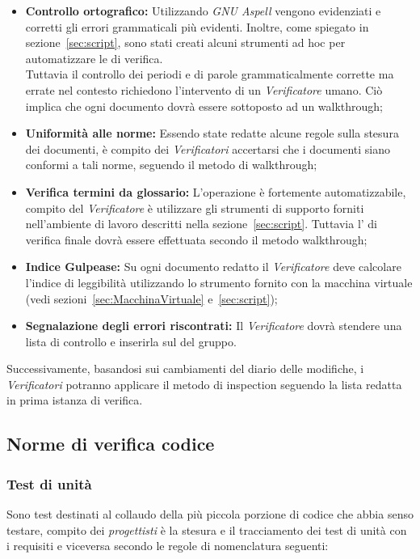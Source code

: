 \documentclass{scalatekids-article}
\begin{document}
\begin{itemize}
\item\textbf{Controllo ortografico:} Utilizzando \textit{GNU Aspell} vengono evidenziati e corretti
  gli errori grammaticali più evidenti. Inoltre, come spiegato in sezione~\ref{sec:script}, sono stati
  creati alcuni strumenti ad hoc per automatizzare le  di verifica.\\
  Tuttavia il controllo dei periodi e di parole grammaticalmente corrette ma errate nel contesto richiedono
  l'intervento di un \textit{Verificatore} umano. Ciò implica che ogni documento dovrà essere sottoposto ad un walkthrough;
\item\textbf{Uniformità alle norme:} Essendo state redatte alcune regole sulla stesura dei documenti, è compito dei \textit{Verificatori}
  accertarsi che i documenti siano conformi a tali norme, seguendo il metodo di walkthrough;
\item\textbf{Verifica termini da glossario:} L'operazione è fortemente automatizzabile, compito del \textit{Verificatore} è utilizzare gli strumenti di supporto
  forniti nell'ambiente di lavoro descritti nella sezione~\ref{sec:script}. Tuttavia l' di verifica finale dovrà essere effettuata secondo il metodo
  walkthrough;
\item\textbf{Indice Gulpease:} Su ogni documento redatto il \textit{Verificatore} deve calcolare l'indice di leggibilità utilizzando lo strumento fornito
  con la macchina virtuale (vedi sezioni~\ref{sec:MacchinaVirtuale} e~\ref{sec:script});
\item\textbf{Segnalazione degli errori riscontrati:} Il \textit{Verificatore} dovrà stendere una lista di controllo e inserirla sul  del gruppo.
\end{itemize}
Successivamente, basandosi sui cambiamenti del diario delle modifiche, i
\textit{Verificatori} potranno applicare il metodo di inspection seguendo la
lista redatta in prima istanza di verifica.

\subsection{Norme di verifica codice}
\label{sec:NormeDiVerifica}

\subsubsection{Test di unità}

Sono test destinati al collaudo della più piccola porzione di codice che abbia senso
testare, compito dei \textit{progettisti} è la stesura e il tracciamento dei test di
unità con i requisiti e viceversa secondo le regole di nomenclatura seguenti:
\end{document}
